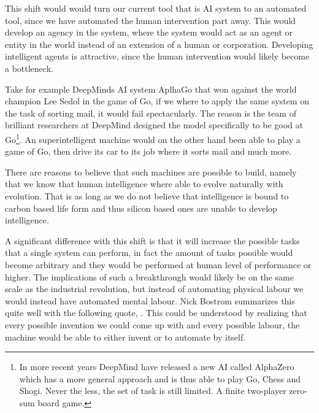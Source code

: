 \documentclass[12pt,A4]{report}
\theoremstyle{definition}
\begin{document}
This shift would would turn our current tool that is AI system to an automated tool, since we have automated the human intervention part away. This would develop an agency in the system, where the system would act as an agent or entity in the world instead of an extension of a human or corporation. Developing intelligent agents is attractive, since the human intervention would likely become a bottleneck.  

Take for example DeepMinds AI system AplhaGo that won against the world champion Lee Sedol in the game of Go, if we where to apply the same system on the task of sorting mail, it would fail spectacularly. The reason is the team of brilliant researchers at DeepMind designed the model specifically to be good at Go\footnote{In more recent years DeepMind have released a new AI called AlphaZero which has a more general approach and is thus able to play Go, Chess and Shogi. Never the less, the set of task is still limited. A finite two-player zero-sum board game.}. An superintelligent machine would on the other hand been able to play a game of Go, then drive its car to its job where it sorts mail and much more. 

There are reasons to believe that such machines are possible to build, namely that we know that human intelligence where able to evolve naturally with evolution. That is as long as we do not believe that intelligence is bound to carbon based life form and thus silicon based ones are unable to develop intelligence.

A significant difference with this shift is that it will increase the possible tasks that a single system can perform, in fact the amount of tasks possible would become arbitrary and they would be performed at human level of performance or higher. The implications of such a breakthrough would likely be on the same scale as the industrial revolution, but instead of automating physical labour we would instead have automated mental labour. Nick Bostrom summarizes this quite well with the following quote, \autocite{Superintelligence Bostrom}. This could be understood by realizing that every possible invention we could come up with and every possible labour, the machine would be able to either invent or to automate by itself.
\end{document}
